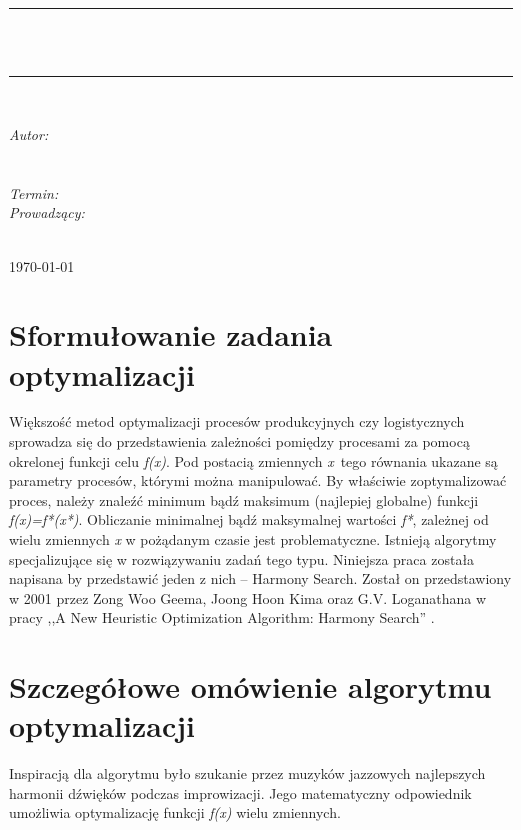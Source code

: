 \documentclass[10pt, a4paper]{article}
\begin{document}
\def\tablename{Tabela}	%
\begin{titlepage}
	\begin{center}
		\textsc{\LARGE \formakursu}\\[1cm]		
		\textsc{\Large \kurs}\\[0.5cm]		
		\rule{\textwidth}{0.08cm}\\[1cm]
		{\huge \bfseries \doctype}\\[1cm]
		\rule{\textwidth}{0.08cm}\\[1cm]
		\begin{flushright} \large
		\emph{Autor: }\\
		\osobaA\\
		\osobaB\\[0.4cm]
		\emph{Termin: }\termin\\[0.4cm]
		\emph{Prowadzący:} \\
		\prowadzacy \\
		\end{flushright}
		\vfill
		{\large \today}
	\end{center}	
\end{titlepage}
\newpage
\tableofcontents
\newpage

\section{Sformułowanie zadania optymalizacji}
\label{sec:1}
Większość metod optymalizacji procesów produkcyjnych czy logistycznych sprowadza się do przedstawienia zależności pomiędzy procesami za pomocą okrelonej funkcji celu {\em f(x)}. Pod postacią zmiennych {\em x}~tego równania ukazane są parametry procesów, którymi można manipulować.  By właściwie zoptymalizować proces, należy znaleźć minimum bądź maksimum (najlepiej globalne) funkcji {\em f(x)=f*(x*)}. Obliczanie minimalnej bądź maksymalnej wartości {\em f*}, zależnej od wielu zmiennych {\em x} w pożądanym czasie jest problematyczne. Istnieją algorytmy specjalizujące się w  rozwiązywaniu zadań tego typu. Niniejsza praca została napisana by przedstawić jeden z nich -- Harmony Search. Został on przedstawiony w 2001 przez Zong Woo Geema, Joong Hoon Kima oraz G.V. Loganathana w pracy ,,A New Heuristic Optimization Algorithm: Harmony Search'' \cite{bib:orginal}.

\section{Szczegółowe omówienie algorytmu optymalizacji}
\label{sec:2}
Inspiracją dla algorytmu było szukanie przez muzyków jazzowych najlepszych harmonii dźwięków podczas improwizacji. Jego matematyczny odpowiednik umożliwia optymalizację funkcji {\em f(x)} wielu zmiennych. 
\end{document}
